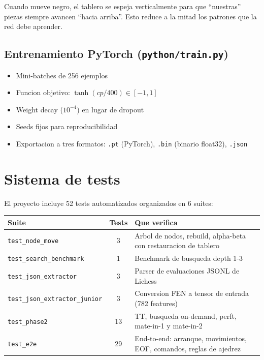 \documentclass[11pt,a4paper]{article}
\begin{document}
Cuando mueve negro, el tablero se espeja verticalmente para que ``nuestras''
piezas siempre avancen ``hacia arriba''. Esto reduce a la mitad los patrones
que la red debe aprender.

\subsection*{Entrenamiento PyTorch (\texttt{python/train.py})}
\begin{itemize}
  \item Mini-batches de 256 ejemplos
  \item Funcion objetivo: $\tanh(cp/400) \in [-1, 1]$
  \item Weight decay ($10^{-4}$) en lugar de dropout
  \item Seeds fijos para reproducibilidad
  \item Exportacion a tres formatos: \texttt{.pt} (PyTorch), \texttt{.bin} (binario float32), \texttt{.json}
\end{itemize}

\section{Sistema de tests}

El proyecto incluye 52 tests automatizados organizados en 6 suites:

\begin{center}
\small
\begin{tabularx}{\textwidth}{@{}l c X@{}}
\toprule
\textbf{Suite} & \textbf{Tests} & \textbf{Que verifica} \\
\midrule
\texttt{test\_node\_move} & 3 & Arbol de nodos, rebuild, alpha-beta con restauracion de tablero \\
\texttt{test\_search\_benchmark} & 1 & Benchmark de busqueda depth 1-3 \\
\texttt{test\_json\_extractor} & 3 & Parser de evaluaciones JSONL de Lichess \\
\texttt{test\_json\_extractor\_junior} & 3 & Conversion FEN a tensor de entrada (782 features) \\
\texttt{test\_phase2} & 13 & TT, busqueda on-demand, perft, mate-in-1 y mate-in-2 \\
\texttt{test\_e2e} & 29 & End-to-end: arranque, movimientos, EOF, comandos, reglas de ajedrez \\
\bottomrule
\end{tabularx}
\end{center}
\end{document}
